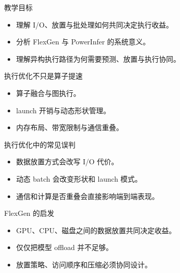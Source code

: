 




\begin{frame}[plain]
  \titlepage
\end{frame}

\begin{frame}{教学目标}
  \begin{itemize}
    \item 理解 I/O、放置与批处理如何共同决定执行收益。
    \item 分析 FlexGen 与 PowerInfer 的系统意义。
    \item 理解异构执行路径为何需要预测、放置与执行协同。
  \end{itemize}
\end{frame}

\begin{frame}{执行优化不只是算子提速}
  \begin{itemize}
    \item 算子融合与图执行。
    \item launch 开销与动态形状管理。
    \item 内存布局、带宽限制与通信重叠。
  \end{itemize}
\end{frame}

\begin{frame}{执行优化中的常见误判}
  \begin{itemize}
    \item 数据放置方式会改写 I/O 代价。
    \item 动态 batch 会改变形状和 launch 模式。
    \item 通信和计算是否重叠会直接影响端到端表现。
  \end{itemize}
\end{frame}

\begin{frame}{FlexGen 的启发}
  \begin{itemize}
    \item GPU、CPU、磁盘之间的数据放置共同决定收益。
    \item 仅仅把模型 offload 并不足够。
    \item 放置策略、访问顺序和压缩必须协同设计。
  \end{itemize}
\end{frame}

